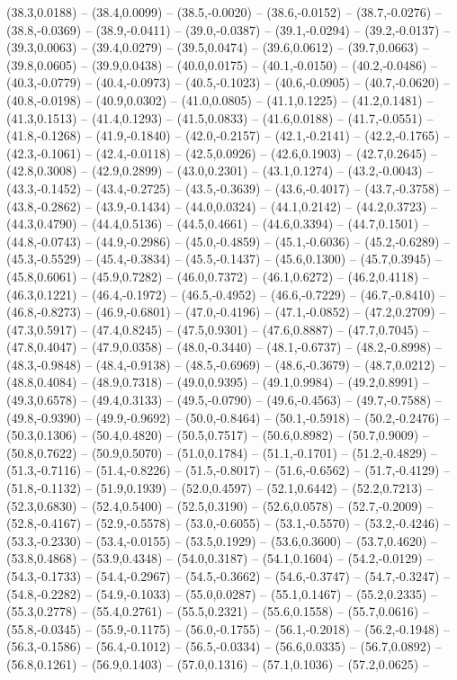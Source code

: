 \documentclass{SVnote}
\begin{document}
(38.3,0.0188) -- (38.4,0.0099) -- (38.5,-0.0020) -- (38.6,-0.0152) -- (38.7,-0.0276) -- (38.8,-0.0369) -- (38.9,-0.0411) -- (39.0,-0.0387) -- (39.1,-0.0294) -- (39.2,-0.0137) -- (39.3,0.0063) -- (39.4,0.0279) -- (39.5,0.0474) -- (39.6,0.0612) -- (39.7,0.0663) -- (39.8,0.0605) -- (39.9,0.0438) -- (40.0,0.0175) -- (40.1,-0.0150) -- (40.2,-0.0486) -- (40.3,-0.0779) -- (40.4,-0.0973) -- (40.5,-0.1023) -- (40.6,-0.0905) -- (40.7,-0.0620) -- (40.8,-0.0198) -- (40.9,0.0302) -- (41.0,0.0805) -- (41.1,0.1225) -- (41.2,0.1481) -- (41.3,0.1513) -- (41.4,0.1293) -- (41.5,0.0833) -- (41.6,0.0188) -- (41.7,-0.0551) -- (41.8,-0.1268) -- (41.9,-0.1840) -- (42.0,-0.2157) -- (42.1,-0.2141) -- (42.2,-0.1765) -- (42.3,-0.1061) -- (42.4,-0.0118) -- (42.5,0.0926) -- (42.6,0.1903) -- (42.7,0.2645) -- (42.8,0.3008) -- (42.9,0.2899) -- (43.0,0.2301) -- (43.1,0.1274) -- (43.2,-0.0043) -- (43.3,-0.1452) -- (43.4,-0.2725) -- (43.5,-0.3639) -- (43.6,-0.4017) -- (43.7,-0.3758) -- (43.8,-0.2862) -- (43.9,-0.1434) -- (44.0,0.0324) -- (44.1,0.2142) -- (44.2,0.3723) -- (44.3,0.4790) -- (44.4,0.5136) -- (44.5,0.4661) -- (44.6,0.3394) -- (44.7,0.1501) -- (44.8,-0.0743) -- (44.9,-0.2986) -- (45.0,-0.4859) -- (45.1,-0.6036) -- (45.2,-0.6289) -- (45.3,-0.5529) -- (45.4,-0.3834) -- (45.5,-0.1437) -- (45.6,0.1300) -- (45.7,0.3945) -- (45.8,0.6061) -- (45.9,0.7282) -- (46.0,0.7372) -- (46.1,0.6272) -- (46.2,0.4118) -- (46.3,0.1221) -- (46.4,-0.1972) -- (46.5,-0.4952) -- (46.6,-0.7229) -- (46.7,-0.8410) -- (46.8,-0.8273) -- (46.9,-0.6801) -- (47.0,-0.4196) -- (47.1,-0.0852) -- (47.2,0.2709) -- (47.3,0.5917) -- (47.4,0.8245) -- (47.5,0.9301) -- (47.6,0.8887) -- (47.7,0.7045) -- (47.8,0.4047) -- (47.9,0.0358) -- (48.0,-0.3440) -- (48.1,-0.6737) -- (48.2,-0.8998) -- (48.3,-0.9848) -- (48.4,-0.9138) -- (48.5,-0.6969) -- (48.6,-0.3679) -- (48.7,0.0212) -- (48.8,0.4084) -- (48.9,0.7318) -- (49.0,0.9395) -- (49.1,0.9984) -- (49.2,0.8991) -- (49.3,0.6578) -- (49.4,0.3133) -- (49.5,-0.0790) -- (49.6,-0.4563) -- (49.7,-0.7588) -- (49.8,-0.9390) -- (49.9,-0.9692) -- (50.0,-0.8464) -- (50.1,-0.5918) -- (50.2,-0.2476) -- (50.3,0.1306) -- (50.4,0.4820) -- (50.5,0.7517) -- (50.6,0.8982) -- (50.7,0.9009) -- (50.8,0.7622) -- (50.9,0.5070) -- (51.0,0.1784) -- (51.1,-0.1701) -- (51.2,-0.4829) -- (51.3,-0.7116) -- (51.4,-0.8226) -- (51.5,-0.8017) -- (51.6,-0.6562) -- (51.7,-0.4129) -- (51.8,-0.1132) -- (51.9,0.1939) -- (52.0,0.4597) -- (52.1,0.6442) -- (52.2,0.7213) -- (52.3,0.6830) -- (52.4,0.5400) -- (52.5,0.3190) -- (52.6,0.0578) -- (52.7,-0.2009) -- (52.8,-0.4167) -- (52.9,-0.5578) -- (53.0,-0.6055) -- (53.1,-0.5570) -- (53.2,-0.4246) -- (53.3,-0.2330) -- (53.4,-0.0155) -- (53.5,0.1929) -- (53.6,0.3600) -- (53.7,0.4620) -- (53.8,0.4868) -- (53.9,0.4348) -- (54.0,0.3187) -- (54.1,0.1604) -- (54.2,-0.0129) -- (54.3,-0.1733) -- (54.4,-0.2967) -- (54.5,-0.3662) -- (54.6,-0.3747) -- (54.7,-0.3247) -- (54.8,-0.2282) -- (54.9,-0.1033) -- (55.0,0.0287) -- (55.1,0.1467) -- (55.2,0.2335) -- (55.3,0.2778) -- (55.4,0.2761) -- (55.5,0.2321) -- (55.6,0.1558) -- (55.7,0.0616) -- (55.8,-0.0345) -- (55.9,-0.1175) -- (56.0,-0.1755) -- (56.1,-0.2018) -- (56.2,-0.1948) -- (56.3,-0.1586) -- (56.4,-0.1012) -- (56.5,-0.0334) -- (56.6,0.0335) -- (56.7,0.0892) -- (56.8,0.1261) -- (56.9,0.1403) -- (57.0,0.1316) -- (57.1,0.1036) -- (57.2,0.0625) -- 
\end{document}
